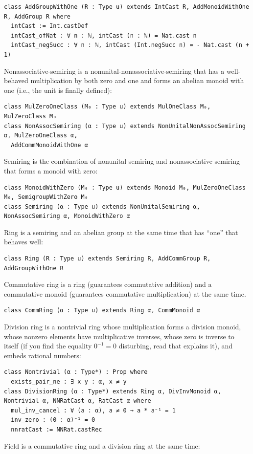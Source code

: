 \documentclass[]{article}
\renewcommand{\.}{\hskip .75pt}
\begin{document}
\begin{lstlisting}
class AddGroupWithOne (R : Type u) extends IntCast R, AddMonoidWithOne R, AddGroup R where
  intCast := Int.castDef
  intCast_ofNat : ∀ n : ℕ, intCast (n : ℕ) = Nat.cast n 
  intCast_negSucc : ∀ n : ℕ, intCast (Int.negSucc n) = - Nat.cast (n + 1) 
\end{lstlisting}
Nonassociative-semiring is a nonunital-nonassociative-semiring that has a well-behaved multiplication
by both zero and one and forms an abelian monoid with one (i.e., the unit is finally defined):
\begin{lstlisting}
class MulZeroOneClass (M₀ : Type u) extends MulOneClass M₀, MulZeroClass M₀
class NonAssocSemiring (α : Type u) extends NonUnitalNonAssocSemiring α, MulZeroOneClass α,
  AddCommMonoidWithOne α
\end{lstlisting}
Semiring is the combination of nonunital-semiring and nonassociative-semiring that forms a monoid with zero:
\begin{lstlisting}
class MonoidWithZero (M₀ : Type u) extends Monoid M₀, MulZeroOneClass M₀, SemigroupWithZero M₀
class Semiring (α : Type u) extends NonUnitalSemiring α, NonAssocSemiring α, MonoidWithZero α
\end{lstlisting}
Ring is a semiring and an abelian group at the same time that has ``one'' that behaves well:
\begin{lstlisting}
class Ring (R : Type u) extends Semiring R, AddCommGroup R, AddGroupWithOne R
\end{lstlisting}
Commutative ring is a ring (guarantees commutative addition) and a commutative monoid (guarantees commutative multiplication)
at the same time.
\begin{lstlisting}
class CommRing (α : Type u) extends Ring α, CommMonoid α
\end{lstlisting}
Division ring is a nontrivial ring whose multiplication forms a division monoid, whose nonzero elements have
multiplicative inverses, whose zero is inverse to itself
(if you find the equality $0^{-1}\!=\!0$ disturbing, read \cite{DivBy0} that explains it),
and embeds rational numbers:
\begin{lstlisting}
class Nontrivial (α : Type*) : Prop where
  exists_pair_ne : ∃ x y : α, x ≠ y
class DivisionRing (α : Type*) extends Ring α, DivInvMonoid α, Nontrivial α, NNRatCast α, RatCast α where
  mul_inv_cancel : ∀ (a : α), a ≠ 0 → a * a⁻¹ = 1
  inv_zero : (0 : α)⁻¹ = 0
  nnratCast := NNRat.castRec
\end{lstlisting}
Field is a commutative ring and a division ring at the same time:
\end{document}
